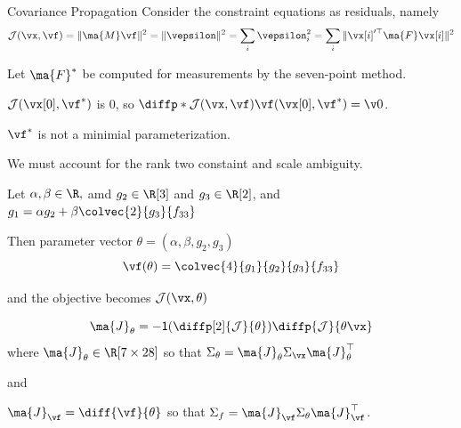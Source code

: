 \documentclass[8pt,aspectratio=169]{beamer}
\begin{document}
\begin{frame}[fragile]{Covariance Propagation}
  Consider the constraint equations as residuals, namely
  \[
  \mathcal{J}(\vx,\vf)= \| \ma{M}\vf \|^2 = \|\vepsilon \|^2 = \sum_i \vepsilon_i^2  = \sum_i \| \vx[i]^{\prime \T} \ma{F} \vx[i] \|^2
  \]
  
  Let $\ma{F}^{*}$ be computed for measurements \vx[0] by the seven-point method.
  \bigskip

  $\mathcal{J}(\vx[0],\vf^{*})$ is 0, so  $\diffp*{\mathcal{J}(\vx,\vf)}{\vf}{(\vx[0],\vf^{*})} = \v0$.
\end{frame}

\begin{frame}
  $\vf^{*}$ is not a minimial parameterization.
  \bigskip

  We must account for the rank two constaint and scale ambiguity.
  \bigskip
  
  Let $\alpha,\beta \in \R,$ amd $g_2 \in \R[3]$ and $g_3 \in \R[2]$, and $g_1 = \alpha g_2 + \beta \colvec{2}{g_3}{f_{33}}$

  Then parameter vector $\theta = (\alpha,\beta,g_2,g_3)$
  \[
  \vf(\theta) = \colvec{4}{g_1}{g_2}{g_3}{f_{33}}
  \]

  and the objective becomes $\mathcal{J}(\vx,\theta)$
\end{frame}

\begin{frame}
  \begin{equation}
    \ma{J}_{\theta} = \inv{\left(\diffp[2]{\mathcal{J}}{\theta}\right)}\diffp{\mathcal{J}}{\theta \vx}
  \end{equation}
  \bigskip
  where $\ma{J}_{\theta} \in \R[7 \times 28]$ so that $\Sigma_{\theta} = \ma{J}_{\theta}\Sigma_{\vx}\ma{J}^{\T}_{\theta} $

  \bigskip
  and

  \bigskip
  $\ma{J}_{\vf} = \diff{\vf}{\theta}$ so that  $\Sigma_f = \ma{J}_{\vf} \Sigma_{\theta} \ma{J}^{\T}_{\vf}$.


\end{frame}
\end{document}
